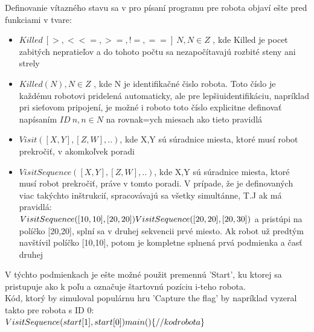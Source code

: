 Definovanie vítazného stavu sa v pro písaní programu pre robota objaví ešte pred funkciami v tvare:
\begin{itemize}
\item $Killed\ [>, < <=, >=, !=, ==]\ N, N \in Z$ , kde Killed je pocet zabitých nepratieľov a do tohoto počtu sa nezapočítavajú rozbité steny ani strely
\item $Killed( N ), N \in Z$ , kde N je identifikačné čislo robota. Toto číslo je každému robotovi pridelená automaticky, ale pre lepšiuidentifikáciu, napríklad pri sieťovom pripojení, je možné i roboto toto číslo explicitne definovať napísaním $ ID\ n, n\in N$ na rovnak=ych miesach ako tieto pravidlá
\item $Visit([X,Y], [Z,W],..)$, kde X,Y sú súradnice miesta, ktoré musí robot prekročiť, v akomkoľvek poradi
\item $VisitSequence([X,Y], [Z,W],..)$, kde X,Y sú súradnice miesta, ktoré musí robot prekročiť, práve v tomto poradi. V prípade, že je definovaných viac takýchto inštrukcií, spracovávajú sa všetky simultánne, T.J ak má pravidlá:\\
$VisitSequence([10,10],[20,20])\\VisitSequence([20,20],[20,30])$ a pristúpi na políčko [20,20], splní sa v druhej sekvencii prvé miesto. Ak robot už predtým navštívil políčko [10,10], potom je kompletne splnená prvá podmienka a časť druhej
\end{itemize}
V týchto podmienkach je ešte možné použit premennú 'Start', ku ktorej sa pristupuje ako k poľu a označuje štartovnú pozíciu i-teho robota.\\
Kód, ktorý by simuloval populárnu hru 'Capture the flag' by napríklad vyzeral takto pre robota s ID 0:\\
$VisitSequence(start[1],start[0]) \\ main()\\\{\\//kod robota\\\}\\$
